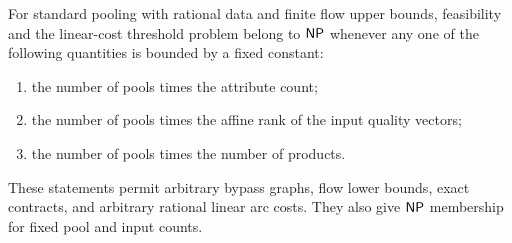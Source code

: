 \begin{corollary}\label{s2:pooling-np}
For standard pooling with rational data and finite flow upper bounds,
feasibility and the linear-cost threshold problem belong to $\mathsf{NP}$
whenever any one of the following quantities is bounded by a fixed
constant:
\begin{enumerate}[label=(\roman*)]
 \item the number of pools times the attribute count;
 \item the number of pools times the affine rank of the input quality
 vectors;
 \item the number of pools times the number of products.
\end{enumerate}
These statements permit arbitrary bypass graphs, flow lower bounds,
exact contracts, and arbitrary rational linear arc costs. They also
give $\mathsf{NP}$ membership for fixed pool and input counts.
\end{corollary}
